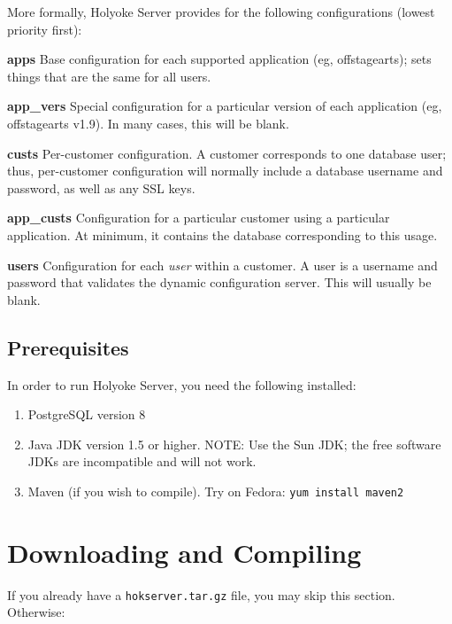 \documentclass[11pt]{article}
\begin{document}
More formally, Holyoke Server provides for the following configurations (lowest priority first):
\begin{description}
 \item{\bf apps} Base configuration for each supported application (eg, offstagearts); sets things that are the same for all users.
 \item{\bf app\_vers} Special configuration for a particular version of each application (eg, offstagearts v1.9).  In many cases, this will be blank.
 \item{\bf custs} Per-customer configuration.  A customer corresponds to one database user; thus, per-customer configuration will normally include a database username and password, as well as any SSL keys.
 \item{\bf app\_custs} Configuration for a particular customer using a particular application.  At minimum, it contains the database corresponding to this usage.
 \item{\bf users} Configuration for each \emph{user} within a customer.  A user is a username and password that validates the dynamic configuration server.  This will usually be blank.
\end{description}

\subsection{Prerequisites}

In order to run Holyoke Server, you need the following installed:
 \begin{enumerate}
 \item PostgreSQL version 8
 \item Java JDK version 1.5 or higher.  NOTE: Use the Sun JDK; the free software JDKs are incompatible and will not work.
 \item Maven (if you wish to compile).  Try on Fedora: {\tt yum install maven2}
 \end{enumerate}

\section{Downloading and Compiling}

If you already have a {\tt hokserver.tar.gz} file, you may skip this section.  Otherwise:
\end{document}
